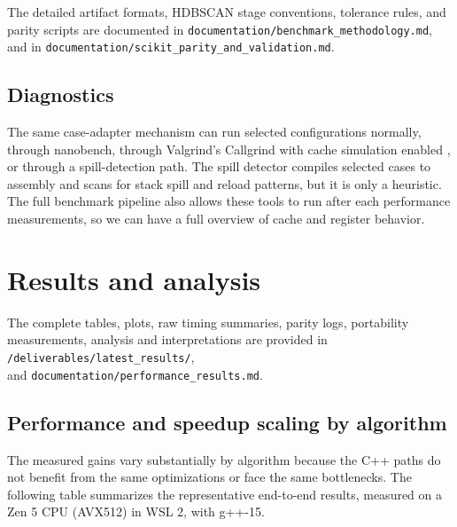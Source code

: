 \documentclass[11pt,a4paper]{article}
\newcommand{\code}[1]{\texttt{#1}}
\begin{document}
The detailed artifact formats, HDBSCAN stage conventions, tolerance rules, and parity scripts are documented in \code{documentation/benchmark\_methodology.md}, \\
and in \code{documentation/scikit\_parity\_and\_validation.md}.

\subsection{Diagnostics}

The same case-adapter mechanism can run selected configurations normally, through nanobench, through Valgrind's Callgrind with cache simulation enabled \cite{nethercote2007valgrind}, or through a spill-detection path. The spill detector compiles selected cases to assembly and scans for stack spill and reload patterns, but it is only a heuristic.
The full benchmark pipeline also allows these tools to run after each performance measurements, so we can have a full overview of cache and register behavior.


\section{Results and analysis}

The complete tables, plots, raw timing summaries, parity logs, portability measurements, analysis and interpretations are provided in \code{/deliverables/latest\_results/}, \\
and \code{documentation/performance\_results.md}.

\subsection{Performance and speedup scaling by algorithm}

The measured gains vary substantially by algorithm because the C++ paths do not benefit from the same optimizations or face the same bottlenecks. The following table summarizes the representative end-to-end results, measured on a Zen 5 CPU (AVX512) in WSL 2, with g++-15.
\end{document}
